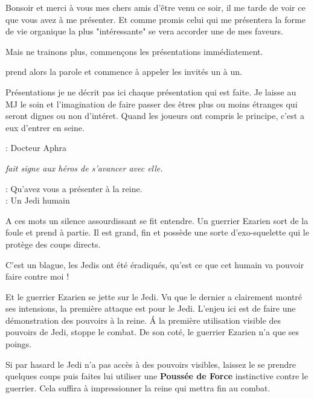 \begin{quotebox}
Bonsoir et merci à vous mes chers amis d’être venu ce soir, il me tarde de voir ce que vous avez à me présenter. Et comme promis celui qui me présentera la forme de vie organique la plus "intéressante" se vera accorder une de mes faveurs.

Mais ne trainons plus, commençons les présentations immédiatement.
\end{quotebox}

 prend alors la parole et commence à appeler les invités un à un.

\begin{paperbox}{Présentations}
je ne décrit pas ici chaque présentation qui est faite. Je laisse au MJ le soin et l’imagination de faire passer des êtres plus ou moins étranges qui seront dignes ou non d’intéret. Quand les joueurs ont compris le principe, c’est a eux d’entrer en seine.
\end{paperbox}

\begin{quotebox}
\noindent\textbf{}: Docteur Aphra

\emph{ fait signe aux héros de s’avancer avec elle.}

\noindent\textbf{}: Qu’avez vous a présenter à la reine.\\
\noindent\textbf{}: Un Jedi humain
\end{quotebox}

A ces mots un silence assourdissant se fit entendre. Un guerrier Ezarien sort de la foule et prend  à partie. Il est grand, fin et possède une sorte d’exo-squelette qui le protège des coups directs.

\begin{quotebox}
C’est un blague, les Jedis ont été éradiqués, qu’est ce que cet humain va pouvoir faire contre moi !
\end{quotebox}

Et le guerrier Ezarien se jette sur le Jedi. Vu que le dernier a clairement montré ses intensions, la première attaque est pour le Jedi. L’enjeu ici est de faire une démonstration des pouvoirs à la reine. \'A la première utilisation visible des pouvoirs de Jedi,  stoppe le combat. De son coté, le guerrier Ezarien n’a que ses poings.

Si par hasard le Jedi n’a pas accès à des pouvoirs visibles, laissez le se prendre quelques coups puis faites lui utiliser une \textbf{Poussée de Force} instinctive contre le guerrier. Cela suffira à impressionner la reine qui mettra fin au combat.

